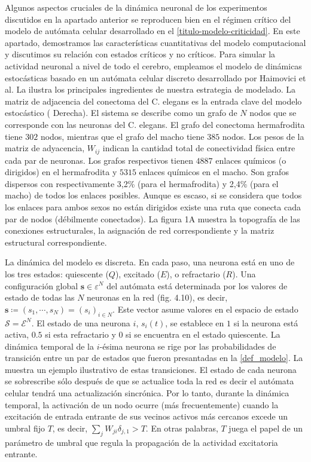 Algunos aspectos cruciales de la dinámica neuronal  de los experimentos discutidos en la apartado anterior se reproducen bien en el régimen crítico del modelo de autómata celular desarrollado en el  \cref{titulo-modelo-criticidad}. En este apartado, demostramos las características cuantitativas del modelo computacional y discutimos su relación con estados críticos y no críticos.  Para simular la actividad neuronal a nivel de todo el cerebro, empleamos el modelo de dinámicas estocásticas basado en un autómata celular discreto desarrollado por Haimovici et al.   La  ilustra los principales ingredientes de nuestra estrategia de modelado.  La  matriz de adjacencia del conectoma del C. elegans es  la entrada clave del modelo estocástico ( Derecha).  El sistema se describe como un grafo  de $N$  nodos que se corresponde con las neuronas del C. elegans.  El grafo del conectoma hermafrodita tiene  $302$ nodos, mientras que el grafo del macho tiene $385$ nodos.  Los pesos de la matriz de adyacencia, $W_{i j}$  indican la cantidad total de conectividad física entre cada par de neuronas.  Los grafos respectivos tienen $4887$ enlaces químicos (o dirigidos)  en el hermafrodita y $5315$ enlaces químicos  en el macho. Son grafos dispersos con respectivamente 3,2\% (para el hermafrodita) y 2,4\% (para el macho) de todos los enlaces posibles.   Aunque es escaso, si se considera que todos los enlaces para ambos sexos no están dirigidos existe  una ruta que conecta cada par de nodos (débilmente conectados).  La figura 1A muestra la topografía de las conexiones estructurales, la asignación de red correspondiente y la matriz estructural correspondiente.


La dinámica del modelo es discreta. En cada paso, una neurona está en uno de los tres estados: quiescente ($Q$), excitado ($E$), o refractario ($R$). Una configuración global $\mathbf{s} \in \varepsilon^N$ del autómata está determinada por los valores de estado de todas las $N$ neuronas en la red (fig. 4.10), es decir, $\mathbf{s} \coloneq \left(s_1,\cdots,s_N  \right)=\left(s_i\right)_{i\in N}$.  Este vector asume valores en el espacio de estado $\mathcal{S} = \mathcal{E}^N$.  El estado de una neurona $i$, $s_i(t)$, se establece en $1$ si la neurona está activa, $0.5$ si esta refractario  y $0$  si se encuentra  en el estado quiescente. La dinámica temporal de la $i$-ésima neurona se rige por las probabilidades de transición entre un par de estados que fueron presantadas en  la   \cref{def_modelo}.  La   muestra un ejemplo ilustrativo de estas transiciones.  El estado de cada neurona se sobrescribe sólo después de que se actualice toda la red es decir el autómata celular tendrá una actualización sincrónica. Por lo tanto, durante la dinámica temporal, la activación de un nodo ocurre (más frecuentemente) cuando la excitación de entrada entrante de sus vecinos activos más cercanos excede un umbral fijo $T$, es decir, $\sum_j W_{ji}\delta_{j,1}>T$. En otras palabras, $T$ juega el papel de un parámetro de umbral que regula la propagación de la actividad excitatoria entrante.

